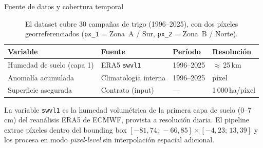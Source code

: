 \documentclass[aspectratio=169,11pt]{beamer}
\begin{document}
\begin{frame}{Fuente de datos y cobertura temporal}
  \renewcommand{\arraystretch}{1.3}
  \begin{table}
    \centering
    \footnotesize
    \begin{tabular}{@{} l l l l @{}}
      \toprule
      \textbf{Variable} & \textbf{Fuente} & \textbf{Período} & \textbf{Resolución} \\
      \midrule
      Humedad de suelo (capa 1) & ERA5 \texttt{swvl1} & 1996--2025 & $\approx$\,25\,km \\
      Anomalía acumulada & Climatología interna & 1996--2025 & píxel \\
      Superficie asegurada & Contrato (input) & --- & 1\,000\,ha/píxel \\
      \bottomrule
    \end{tabular}
    \caption{El dataset cubre 30 campañas de trigo (1996--2025),
    con dos píxeles georreferenciados (\texttt{px\_1} = Zona~A / Sur,
    \texttt{px\_2} = Zona~B / Norte).}
  \end{table}
  \vspace{0.3em}
  {\scriptsize\textcolor{smidgray}{%
    La variable \texttt{swvl1} es la humedad volumétrica de la primera capa de suelo
    (0--7\,cm) del reanálisis ERA5 de ECMWF, provista a resolución diaria.
    El pipeline extrae píxeles dentro del bounding box
    $[-81{,}74;\,-66{,}85]\times[-4{,}23;\,13{,}39]$ y los procesa en modo
    \textit{pixel-level} sin interpolación espacial adicional.}}
\end{frame}
\end{document}
